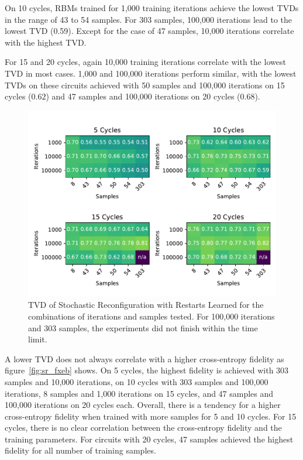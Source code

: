 On 10 cycles, RBMs trained for 1,000 training iterations achieve the lowest TVDs in the range of 43 to 
54 samples. For 303 samples, 100,000 iterations lead to the lowest TVD (0.59). Except for the 
case of 47 samples, 10,000 iterations correlate with the highest TVD.

For 15 and 20 cycles, again 10,000 training iterations correlate with the lowest TVD in most cases. 1,000
and 100,000 iterations perform similar, with the lowest TVDs on these circuits achieved with 50 samples and 
100,000 iterations on 15 cycles ($0.62$) and 47 samples and 100,000 iterations on 20 cycles ($0.68$).

\begin{figure}[H]
  \centering
  \includegraphics[width=\textwidth]{figures/results/SR-restarts-learned/tvd_heatmap.pdf}
  \caption[TVD of Stochastic Reconfiguration with Restarts Learned]{TVD of Stochastic 
  Reconfiguration with Restarts Learned for the combinations of iterations and samples tested.
  For 100,000 iterations and 303 samples, the experiments did not finish within the time limit.}
  \label{fig:sr_tvd}
\end{figure}

A lower TVD does not always correlate with a higher cross-entropy fidelity as figure~\ref{fig:sr_fxeb}
shows. On 5 cycles, the highest fidelity is achieved with 303 samples and 10,000 iterations, on 10 cycles 
with 303 samples and 100,000 iterations, 8 samples and 1,000 iterations on 15 cycles, and 47 samples and 
100,000 iterations on 20 cycles each. Overall, there is a tendency for a higher cross-entropy fidelity 
when trained with more samples for 5 and 10 cycles. For 15 cycles, there is no clear correlation between the 
cross-entropy fidelity and the training parameters. For circuits with 20 cycles, 47 samples achieved the highest 
fidelity for all number of training samples.

